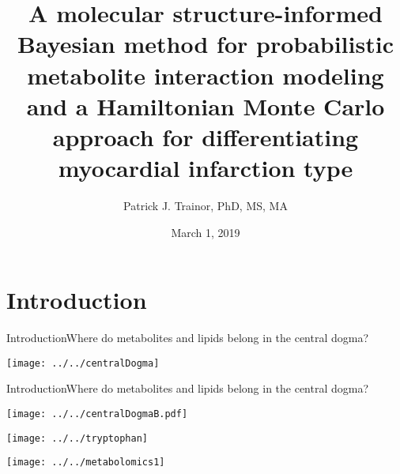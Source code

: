 \documentclass[xcolor=dvipsnames]{beamer}
\begin{document}
	
\title[Metabolite Interactomes \& HMC Modeling]{{\bf A molecular structure-informed Bayesian method for probabilistic metabolite interaction modeling and a Hamiltonian Monte Carlo approach for differentiating myocardial infarction type}}
\author[P.J. Trainor]{Patrick J. Trainor, PhD, MS, MA}
\date[March 2019]{March 1, 2019}

\begin{frame}
	\titlepage
\end{frame}

\section{Introduction}

\begin{frame}{Introduction}{Where do metabolites and lipids belong in the central dogma?}
\vspace{-7 pt}
\begin{center}
		\texttt{[image: ../../centralDogma]}
	\end{center}
\end{frame}

\begin{frame}{Introduction}{Where do metabolites and lipids belong in the central dogma?}
\vspace{-7 pt}
\begin{center}
	\texttt{[image: ../../centralDogmaB.pdf]}
\end{center}
\addtocounter{framenumber}{-1}
\end{frame}

\begin{frame}
	\vspace{-10.5pt}
	\begin{center}
		\texttt{[image: ../../tryptophan]}
		
	\end{center}
\end{frame}

\begin{frame}
\begin{center}
	\texttt{[image: ../../metabolomics1]}
\end{center}
\addtocounter{framenumber}{-1}
\end{frame}
\end{document}
